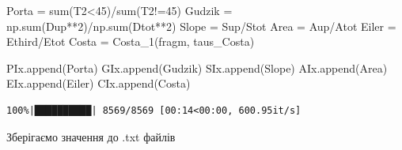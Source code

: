 \documentclass[
  letterpaper,
]{report}
\newenvironment{Shaded}{\begin{snugshade}}{\end{snugshade}}
\newcommand{\BuiltInTok}[1]{\textcolor[rgb]{0.00,0.23,0.31}{#1}}
\newcommand{\DecValTok}[1]{\textcolor[rgb]{0.68,0.00,0.00}{#1}}
\newcommand{\NormalTok}[1]{\textcolor[rgb]{0.00,0.23,0.31}{#1}}
\newcommand{\OperatorTok}[1]{\textcolor[rgb]{0.37,0.37,0.37}{#1}}
\begin{document}
\begin{Shaded}
\begin{Highlighting}[]
    
\NormalTok{    Porta }\OperatorTok{=} \BuiltInTok{sum}\NormalTok{(T2}\OperatorTok{\textless{}}\DecValTok{45}\NormalTok{)}\OperatorTok{/}\BuiltInTok{sum}\NormalTok{(T2}\OperatorTok{!=}\DecValTok{45}\NormalTok{)}
\NormalTok{    Gudzik }\OperatorTok{=}\NormalTok{ np.}\BuiltInTok{sum}\NormalTok{(Dup}\OperatorTok{**}\DecValTok{2}\NormalTok{)}\OperatorTok{/}\NormalTok{np.}\BuiltInTok{sum}\NormalTok{(Dtot}\OperatorTok{**}\DecValTok{2}\NormalTok{)}
\NormalTok{    Slope }\OperatorTok{=}\NormalTok{ Sup}\OperatorTok{/}\NormalTok{Stot}
\NormalTok{    Area }\OperatorTok{=}\NormalTok{ Aup}\OperatorTok{/}\NormalTok{Atot}
\NormalTok{    Eiler }\OperatorTok{=}\NormalTok{ Ethird}\OperatorTok{/}\NormalTok{Etot}
\NormalTok{    Costa }\OperatorTok{=}\NormalTok{ Costa\_1(fragm, taus\_Costa)}
    
\NormalTok{    PIx.append(Porta)}
\NormalTok{    GIx.append(Gudzik)}
\NormalTok{    SIx.append(Slope)}
\NormalTok{    AIx.append(Area)}
\NormalTok{    EIx.append(Eiler)}
\NormalTok{    CIx.append(Costa)}
\end{Highlighting}
\end{Shaded}

\begin{verbatim}
100%|██████████| 8569/8569 [00:14<00:00, 600.95it/s]
\end{verbatim}

Зберігаємо значення до .txt файлів
\end{document}

